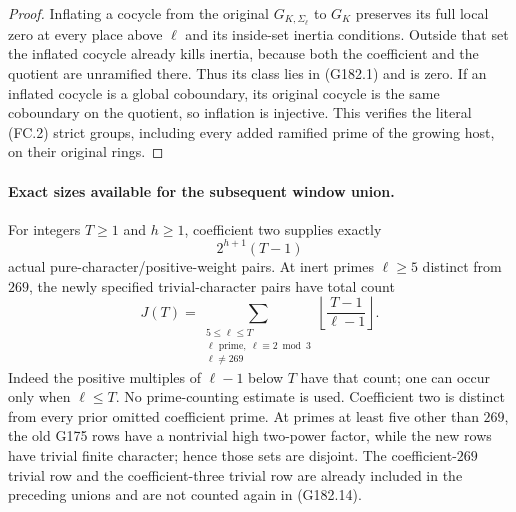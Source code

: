 \begin{proof}
Inflating a cocycle from the original $G_{K,\Sigma_\ell}$ to $G_K$
preserves its full local zero at every place above $\ell$ and its
inside-set inertia conditions.  Outside that set the inflated cocycle
already kills inertia, because both the coefficient and the quotient
are unramified there.  Thus its class lies in (G182.1) and is zero.
If an inflated cocycle is a global coboundary, its original cocycle
is the same coboundary on the quotient, so inflation is injective.
This verifies the literal (FC.2) strict groups, including every added
ramified prime of the growing host, on their original rings.
\end{proof}

\paragraph{Exact sizes available for the subsequent window union.}
For integers $T\geq1$ and $h\geq1$, coefficient two supplies exactly
\[
                         2^{h+1}(T-1)
 \tag{G182.13}
\]
actual pure-character/positive-weight pairs.
At inert primes $\ell\geq5$ distinct from $269$, the newly specified
trivial-character pairs have total count
\[
 J(T)=\sum_{\substack{5\leq\ell\leq T\\
                     \ell\text{ prime},\ \ell\equiv2\bmod3\\
                     \ell\ne269}}
                     \left\lfloor\frac{T-1}{\ell-1}\right\rfloor.
 \tag{G182.14}
\]
Indeed the positive multiples of $\ell-1$ below $T$ have that count;
one can occur only when $\ell\leq T$.  No prime-counting estimate
is used.  Coefficient two is distinct from every prior omitted
coefficient prime.  At primes at least five other than $269$, the
old G175 rows have a nontrivial high two-power factor, while the
new rows have trivial finite character; hence those sets are disjoint.
The coefficient-$269$ trivial row and the coefficient-three trivial
row are already included in the preceding unions and are not counted
again in (G182.14).

